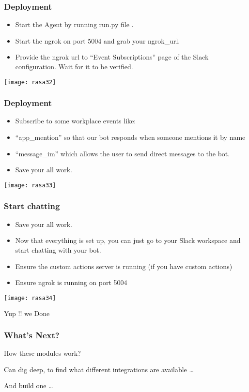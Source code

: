 \begin{frame}[fragile]\frametitle{Deployment}
\begin{itemize}
\item Start the Agent by running run.py file .
\item Start the ngrok on port 5004 and grab your ngrok\_url.
\item Provide the ngrok url to ``Event Subscriptions'' page of the Slack configuration. Wait for it to be verified.
\end{itemize}

\begin{center}
\texttt{[image: rasa32]}
\end{center}
\end{frame}


\begin{frame}[fragile]\frametitle{Deployment}
\begin{itemize}
\item Subscribe to some workplace events like:
\item ``app\_mention'' so that our bot responds when someone mentions it by name
\item ``message\_im'' which allows the user to send direct messages to the bot.
\item Save your all work.
\end{itemize}

\begin{center}
\texttt{[image: rasa33]}
\end{center}
\end{frame}

\begin{frame}[fragile]\frametitle{Start chatting }
\begin{itemize}
\item Save your all work.
\item Now that everything is set up, you can just go to your Slack workspace and start chatting with your bot.
\item  Ensure the custom actions server is running (if you have custom actions)
\item Ensure ngrok is running on port 5004
\end{itemize}

\begin{center}
\texttt{[image: rasa34]}
\end{center}

Yup !! we Done
\end{frame}

\begin{frame}[fragile]\frametitle{What's Next?}
How these modules work? 

Can dig deep, to find what different integrations are available \ldots

And build one \ldots

\end{frame}
